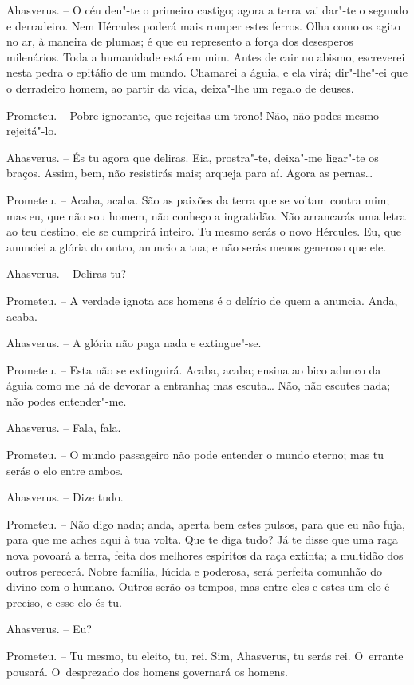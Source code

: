 Ahasverus. -- O céu deu"-te o primeiro castigo; agora a terra vai dar"-te
o segundo e derradeiro. Nem Hércules poderá mais romper estes ferros.
Olha como os agito no ar, à maneira de plumas; é que eu represento a
força dos desesperos milenários. Toda a humanidade está em mim. Antes de
cair no abismo, escreverei nesta pedra o epitáfio de um mundo. Chamarei
a águia, e ela virá; dir"-lhe"-ei que o derradeiro homem, ao partir da
vida, deixa"-lhe um regalo de deuses.

Prometeu. -- Pobre ignorante, que rejeitas um trono! Não, não podes
mesmo rejeitá"-lo.

Ahasverus. -- És tu agora que deliras. Eia, prostra"-te, deixa"-me
ligar"-te os braços. Assim, bem, não resistirás mais; arqueja para aí.
Agora as pernas\ldots{}

Prometeu. -- Acaba, acaba. São as paixões da terra que se voltam contra
mim; mas eu, que não sou homem, não conheço a ingratidão. Não arrancarás
uma letra ao teu destino, ele se cumprirá inteiro. Tu mesmo serás o novo
Hércules. Eu, que anunciei a glória do outro, anuncio a tua; e não serás
menos generoso que ele.

Ahasverus. -- Deliras tu?

Prometeu. -- A verdade ignota aos homens é o delírio de quem a anuncia.
Anda, acaba.

Ahasverus. -- A glória não paga nada e extingue"-se.

Prometeu. -- Esta não se extinguirá. Acaba, acaba; ensina ao bico adunco
da águia como me há de devorar a entranha; mas escuta\ldots{} Não, não
escutes nada; não podes entender"-me.

Ahasverus. -- Fala, fala.

Prometeu. -- O mundo passageiro não pode entender o mundo eterno; mas tu
serás o elo entre ambos.

Ahasverus. -- Dize tudo.

Prometeu. -- Não digo nada; anda, aperta bem estes pulsos, para que eu
não fuja, para que me aches aqui à tua volta. Que te diga tudo? Já te
disse que uma raça nova povoará a terra, feita dos melhores espíritos da
raça extinta; a multidão dos outros perecerá. Nobre família, lúcida e
poderosa, será perfeita comunhão do divino com o humano. Outros serão os
tempos, mas entre eles e estes um elo é preciso, e esse elo és tu.

Ahasverus. -- Eu?

Prometeu. -- Tu mesmo, tu eleito, tu, rei. Sim, Ahasverus, tu serás rei.
O~errante pousará. O~desprezado dos homens governará os homens.


